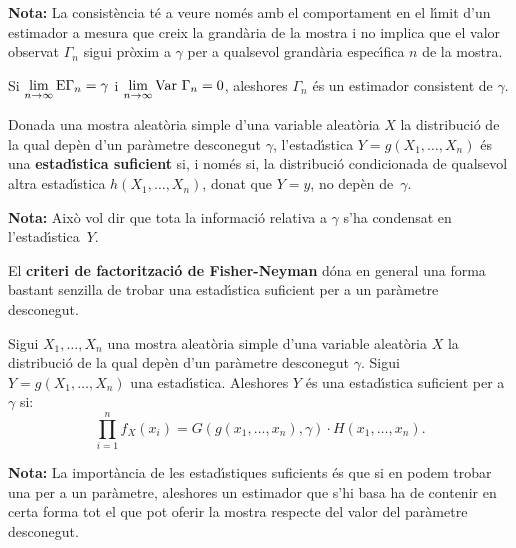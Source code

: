 \begin{enumerate}
{\bf Nota:} La consist\`encia 
t\'e a veure nom\'es amb el comportament en el l\'{\i}mit
d'un estimador a mesura que creix la grand\`aria de la mostra i no implica que el
valor observat $\Gamma_n$ sigui pr\`oxim a $\gamma$ per a qualsevol grand\`aria
espec\'{\i}fica $n$ de la mostra.

\begin{proposition}
Si $\displaystyle \lim_{n \to \infty} {\rm E}\Gamma_n = \gamma$ i
$\displaystyle \lim_{n \to \infty} {\rm Var}\  \Gamma_n = 0$, 
aleshores $\Gamma_n$ \'es un estimador consistent de $\gamma$.
\end{proposition}
\end{enumerate}

\begin{defin}
Donada una mostra aleat\`oria simple d'una variable aleat\`oria $X$ la
distribuci\'o de la qual dep\`en d'un par\`ametre 
desconegut $\gamma$, l'estad\'{\i}stica\break
$Y = g(X_1, \ldots , X_n)$ \'es una {\bf estad\'{\i}stica suficient}
si, i nom\'es si, la distribuci\'o condicionada de qualsevol altra 
estad\'{\i}stica $h(X_1, \ldots , X_n)$, donat que $Y = y$, no dep\`en de~$\gamma$.
\end{defin}

{\bf Nota:} Aix\`o vol dir que tota la informaci\'o relativa a $\gamma$ s'ha
condensat en l'es\-ta\-d\'{\i}s\-ti\-ca~$Y$.

El {\bf criteri de factoritzaci\'o de Fisher-Neyman} 
d\'ona en general una forma bastant senzilla de trobar una estad\'{\i}stica suficient 
 per a un par\`ametre
desconegut.

\begin{proposition}
Sigui $X_1, \ldots , X_n$ una mostra aleat\`oria simple d'una
variable alea\-t\`oria $X$ la distribuci\'o de la qual dep\`en d'un par\`ametre desconegut
$\gamma$. Sigui \break $Y = g(X_1, \ldots , X_n)$ una estad\'{\i}stica. Aleshores 
$Y$ \'es una
estad\'{\i}stica suficient per a $\gamma$ si:
$$\prod_{i=1}^n f_X(x_i) = G(g(x_1, \ldots , x_n), \gamma) \cdot H(x_1, \ldots ,
x_n).$$
\end{proposition}

{\bf Nota:} La import\`ancia de les estad\'{\i}stiques suficients \'es que si en podem
trobar una per a un par\`ametre, aleshores un estimador que s'hi basa ha de
contenir en certa forma tot el que pot oferir la mostra respecte del valor del
par\`ametre desconegut.

